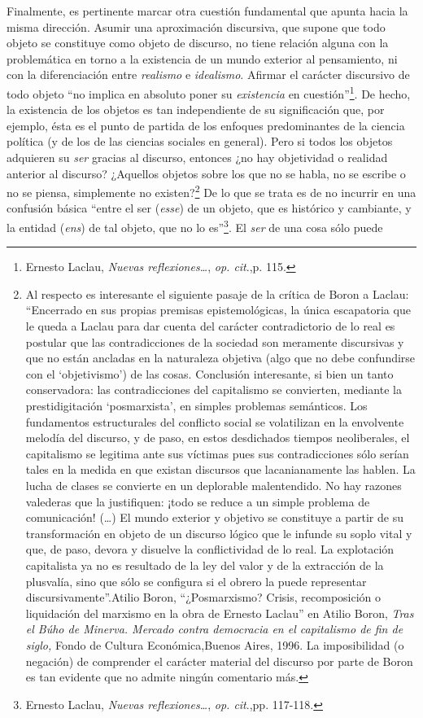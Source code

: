Finalmente, es pertinente marcar otra cuestión fundamental que apunta hacia la misma dirección. Asumir una aproximación discursiva, que supone que todo objeto se constituye como objeto de discurso, no tiene relación alguna con la problemática en torno a la existencia de un mundo exterior al pensamiento, ni con la diferenciación entre \emph{realismo} e \emph{idealismo}. Afirmar el carácter discursivo de todo objeto \enquote{no implica en absoluto poner su \emph{existencia} en cuestión}\footnote{Ernesto Laclau, \emph{Nuevas reflexiones\ldots{}}, \emph{op. cit}.,p. 115.}. De hecho, la existencia de los objetos es tan independiente de su significación que, por ejemplo, ésta es el punto de partida de los enfoques predominantes de la ciencia política (y de los de las ciencias sociales en general). Pero si todos los objetos adquieren su \emph{ser} gracias al discurso, entonces ¿no hay objetividad o realidad anterior al discurso? ¿Aquellos objetos sobre los que no se habla, no se escribe o no se piensa, simplemente no existen?\footnote{Al respecto es interesante el siguiente pasaje de la crítica de Boron a Laclau: \enquote{Encerrado en sus propias premisas epistemológicas, la única escapatoria que le queda a Laclau para dar cuenta del carácter contradictorio de lo real  es postular que las contradicciones de la sociedad son meramente discursivas y que no están ancladas en la naturaleza objetiva (algo que no debe confundirse con el \enquote{objetivismo}) de las cosas. Conclusión interesante, si bien un tanto conservadora: las contradicciones del capitalismo se convierten, mediante la prestidigitación \enquote{posmarxista}, en simples problemas semánticos. Los fundamentos estructurales del conflicto social se volatilizan en la envolvente melodía del discurso, y de paso, en estos desdichados tiempos neoliberales, el capitalismo se legitima ante sus víctimas pues sus contradicciones sólo serían tales en la medida en que existan discursos que lacanianamente las hablen. La lucha de clases se convierte en un deplorable malentendido. No hay razones valederas que la justifiquen: ¡todo se reduce a un simple problema de comunicación! (\dots) El mundo exterior y objetivo se constituye a partir de su transformación en objeto de un discurso lógico que le infunde su soplo vital y que, de paso, devora y disuelve la conflictividad de lo real. La explotación capitalista ya no es resultado de la ley del valor y de la extracción de la plusvalía, sino que sólo se configura si el obrero la puede representar discursivamente}.Atilio Boron, \enquote{¿Posmarxismo? Crisis, recomposición o liquidación del marxismo en la obra de Ernesto Laclau} en Atilio Boron, \emph{Tras el Búho de Minerva. Mercado contra democracia en el capitalismo de fin de siglo,} Fondo de Cultura Económica,Buenos Aires, 1996. La imposibilidad (o negación) de comprender el carácter material del discurso por parte de Boron es tan evidente que no admite ningún comentario más.} De lo que se trata es de no incurrir en una confusión básica \enquote{entre el ser (\emph{esse}) de un objeto, que es histórico y cambiante, y la entidad (\emph{ens}) de tal objeto, que no lo es}\footnote{Ernesto Laclau, \emph{Nuevas reflexiones\ldots{}}, \emph{op. cit}.,pp. 117-118.}. El \emph{ser} de una cosa sólo puede 